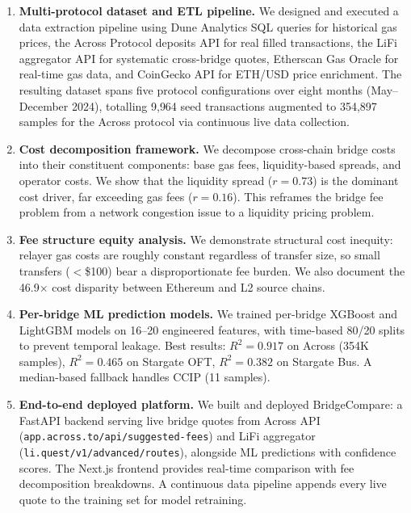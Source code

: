 \begin{enumerate}
    \item \textbf{Multi-protocol dataset and ETL pipeline.} We designed and executed a data extraction pipeline using Dune Analytics SQL queries for historical gas prices, the Across Protocol deposits API for real filled transactions, the LiFi aggregator API for systematic cross-bridge quotes, Etherscan Gas Oracle for real-time gas data, and CoinGecko API for ETH/USD price enrichment. The resulting dataset spans five protocol configurations over eight months (May--December 2024), totalling 9{,}964 seed transactions augmented to 354{,}897 samples for the Across protocol via continuous live data collection.

    \item \textbf{Cost decomposition framework.} We decompose cross-chain bridge costs into their constituent components: base gas fees, liquidity-based spreads, and operator costs. We show that the liquidity spread ($r = 0.73$) is the dominant cost driver, far exceeding gas fees ($r = 0.16$). This reframes the bridge fee problem from a network congestion issue to a liquidity pricing problem.

    \item \textbf{Fee structure equity analysis.} We demonstrate structural cost inequity: relayer gas costs are roughly constant regardless of transfer size, so small transfers ($<$\$100) bear a disproportionate fee burden. We also document the 46.9$\times$ cost disparity between Ethereum and L2 source chains.

    \item \textbf{Per-bridge ML prediction models.} We trained per-bridge XGBoost and LightGBM models on 16--20 engineered features, with time-based 80/20 splits to prevent temporal leakage. Best results: $R^2 = 0.917$ on Across (354K samples), $R^2 = 0.465$ on Stargate OFT, $R^2 = 0.382$ on Stargate Bus. A median-based fallback handles CCIP (11 samples).

    \item \textbf{End-to-end deployed platform.} We built and deployed BridgeCompare: a FastAPI backend serving live bridge quotes from Across API (\texttt{app.across.to/api/suggested-fees}) and LiFi aggregator (\texttt{li.quest/v1/advanced/routes}), alongside ML predictions with confidence scores. The Next.js frontend provides real-time comparison with fee decomposition breakdowns. A continuous data pipeline appends every live quote to the training set for model retraining.
\end{enumerate}


